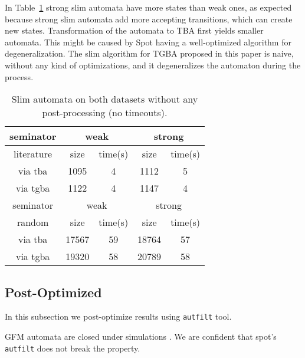 \documentclass[
	digital,
nolof, nolot
]{fithesis3}
\begin{document}
	In Table~\ref{table:seminator:unoptimized} strong slim automata have more states than weak ones, as expected because strong slim automata add more accepting transitions, which can create new states. Transformation of the automata to TBA first yields smaller automata. This might be caused by Spot having a well-optimized algorithm for degeneralization. The slim algorithm for TGBA proposed in this paper is naive, without any kind of optimizations, and it degeneralizes the automaton during the process.
\begin{table}[ht]
	\label{table:seminator:unoptimized}
	\centering
	\caption{Slim automata on both datasets without any post-processing (no timeouts).}
		\begin{tabular}{ |c||c|c|c|c| } 
			\hline
			seminator&\multicolumn{2}{c|}{weak}&\multicolumn{2}{c|}{strong} \\
			\hline
			literature&size&time(s)&size&time(s)\\
			\hhline{|=====|}
			
			via tba	&	1095	&4	& 1112 	&5\\
			\hline
			via tgba&	1122	&4		&1147	&4\\ 
			\hline
			\hline
			\hline
			seminator&\multicolumn{2}{c|}{weak}&\multicolumn{2}{c|}{strong} \\
			\hhline{|=====|}
			random&size&time(s)&size&time(s)\\
			\hline
			via tba&17567&	59& 18764 &57\\
			\hline
			via tgba&19320&	58& 20789&58\\ 
			\hline
		\end{tabular}
\end{table}
	\clearpage
	\subsection{Post-Optimized}
	In this subsection we post-optimize results using \texttt{autfilt} tool.
	
	GFM automata are closed under simulations \cite[Section~3.1]{hlavni}. We are confident that spot's \texttt{autfilt} does not break the property.
	
\end{document}
